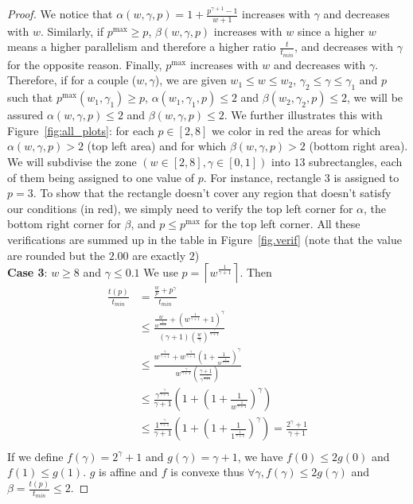 \documentclass{article}
\begin{document}
\begin{proof}
We notice that $\alpha(w,\gamma,p)=1+\frac{p^{\gamma+1}-1}{w+1}$ increases with $\gamma$ and decreases with $w$. Similarly, if $p^{\max} \geq p$, $\beta(w,\gamma,p)$ increases with $w$ since a higher $w$ means a higher parallelism and therefore a higher ratio $\frac{t}{t_{min}}$, and decreases with $\gamma$ for the opposite reason. Finally, $p^{\max}$ increases with $w$ and decreases with $\gamma$. Therefore, if for a couple ($w,\gamma$), we are given $w_1 \leq w \leq w_2$, $\gamma_2 \leq \gamma \leq \gamma_1$ and $p$ such that $p^{\max}(w_1,\gamma_1) \geq p $, $\alpha(w_1,\gamma_1,p) \leq 2$ and $\beta(w_2,\gamma_2,p) \leq 2$, we will be assured $\alpha(w,\gamma,p) \leq 2$ and $\beta(w,\gamma,p) \leq 2$. We further illustrates this with Figure~\ref{fig:all_plots}: for each $p \in [2,8]$ we color in red the areas for which $\alpha(w,\gamma,p) > 2$ (top left area) and for which $\beta(w,\gamma,p) > 2$ (bottom right area). We will subdivise the zone $(w \in [2,8], \gamma \in [0,1])$ into $13$ subrectangles, each of them being assigned to one value of $p$. For instance, rectangle $3$ is assigned to $p=3$. To show that the rectangle doesn't cover any region that doesn't satisfy our conditions (in red), we simply need to verify the top left corner for $\alpha$, the bottom right corner for $\beta$, and $p \leq p^{\max}$ for the top left corner. All these verifications are summed up in the table in Figure~\ref{fig.verif} (note that the value are rounded but the $2.00$ are exactly $2$)\\



\textbf{Case 3}:  $w \geq 8$ and $\gamma \leq 0.1$
We use $p=\left\lceil w^{\frac{1}{\gamma+1}} \right\rceil$.
Then
\begin{align*}
\frac{t(p)}{t_{min}}&=\frac{\frac{w}{p}+p^\gamma}{t_{min}} \\
&\leq \frac{\frac{w}{ w^{\frac{1}{\gamma+1}}}+\left(  w^{\frac{1}{\gamma+1}} +1\right)^\gamma}{ \left( \gamma+1\right)\left( \frac{w}{\gamma} \right)^{\frac{\gamma}{\gamma+1}}} \\
&\leq \frac{w^{\frac{\gamma}{\gamma+1}}+w^{\frac{\gamma}{\gamma+1}}\left(1+\frac{1}{w^{\frac{1}{\gamma+1}}}\right)^\gamma}{ w^{\frac{\gamma}{\gamma+1}}\left( \frac{\gamma+1}{\gamma^{\frac{\gamma}{\gamma+1}}} \right)} \\
&\leq \frac{\gamma^{\frac{\gamma}{\gamma+1}}}{\gamma+1}\left(1+\left(1+\frac{1}{w^{\frac{1}{\gamma+1}}}\right)^\gamma\right) \\
&\leq \frac{1^{\frac{\gamma}{\gamma+1}}}{\gamma+1}\left(1+\left(1+\frac{1}{1^{\frac{1}{\gamma+1}}}\right)^\gamma\right)=\frac{2^\gamma+1}{\gamma+1} \\
\end{align*}
If we define $f(\gamma)=2^\gamma+1$ and $g(\gamma)=\gamma+1$, we have $f(0) \leq 2g(0)$ and $f(1) \leq g(1)$. $g$ is affine and $f$ is convexe thus $\forall \gamma, f(\gamma) \leq 2g(\gamma)$ and $\beta=\frac{t(p)}{t_{min}} \leq 2$.
\end{proof}
\end{document}
